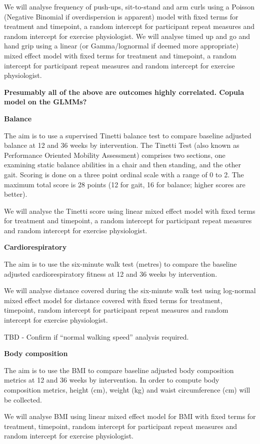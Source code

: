 \documentclass[
]{article}
\begin{document}
We will analyse frequency of push-ups, sit-to-stand and arm curls using a Poisson (Negative Binomial if overdispersion is apparent) model with fixed terms for treatment and timepoint, a random intercept for participant repeat measures and random intercept for exercise physiologist.
We will analyse timed up and go and hand grip using a linear (or Gamma/lognormal if deemed more appropriate) mixed effect model with fixed terms for treatment and timepoint, a random intercept for participant repeat measures and random intercept for exercise physiologist.

\textbf{Presumably all of the above are outcomes highly correlated. Copula model on the GLMMs?}

\textbf{Balance}

The aim is to use a supervised Tinetti balance test to compare baseline adjusted balance at 12 and 36 weeks by intervention.
The Tinetti Test (also known as Performance Oriented Mobility Assessment) comprises two sections, one examining static balance abilities in a chair and then standing, and the other gait.
Scoring is done on a three point ordinal scale with a range of 0 to 2.
The maximum total score is 28 points (12 for gait, 16 for balance; higher scores are better).

We will analyse the Tinetti score using linear mixed effect model with fixed terms for treatment and timepoint, a random intercept for participant repeat measures and random intercept for exercise physiologist.

\textbf{Cardiorespiratory}

The aim is to use the six-minute walk test (metres) to compare the baseline adjusted cardiorespiratory fitness at 12 and 36 weeks by intervention.

We will analyse distance covered during the six-minute walk test using log-normal mixed effect model for distance covered with fixed terms for treatment, timepoint, random intercept for participant repeat measures and random intercept for exercise physiologist.

TBD - Confirm if ``normal walking speed'' analysis required.

\textbf{Body composition}

The aim is to use the BMI to compare baseline adjusted body composition metrics at 12 and 36 weeks by intervention.
In order to compute body composition metrics, height (cm), weight (kg) and waist circumference (cm) will be collected.

We will analyse BMI using linear mixed effect model for BMI with fixed terms for treatment, timepoint, random intercept for participant repeat measures and random intercept for exercise physiologist.
\end{document}
